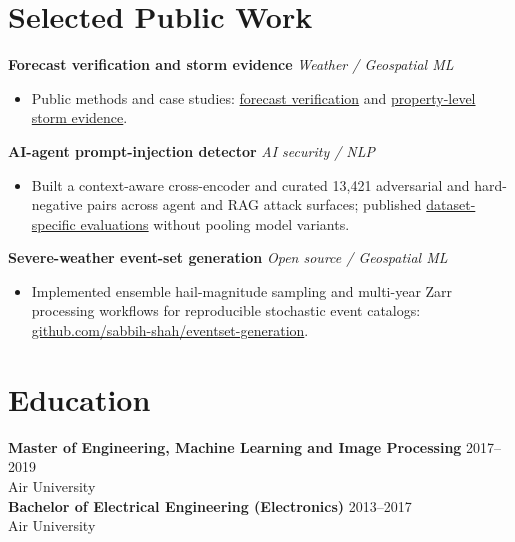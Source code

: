 \documentclass[10pt,letterpaper]{article}
\newcommand{\project}[2]{%
  \textbf{#1} \hfill \textit{#2}\vspace{1pt}
}
\begin{document}
\section*{Selected Public Work}

\project{Forecast verification and storm evidence}{Weather / Geospatial ML}
\begin{itemize}
  \item Public methods and case studies: \href{https://www.editable.ai/forecast/}{forecast verification} and \href{https://www.editable.ai/evidence/}{property-level storm evidence}.
\end{itemize}

\project{AI-agent prompt-injection detector}{AI security / NLP}
\begin{itemize}
  \item Built a context-aware cross-encoder and curated 13,421 adversarial and hard-negative pairs across agent and RAG attack surfaces; published \href{https://sabbih-shah.github.io/projects/agent-security/}{dataset-specific evaluations} without pooling model variants.
\end{itemize}

\project{Severe-weather event-set generation}{Open source / Geospatial ML}
\begin{itemize}
  \item Implemented ensemble hail-magnitude sampling and multi-year Zarr processing workflows for reproducible stochastic event catalogs: \href{https://github.com/sabbih-shah/eventset-generation}{github.com/sabbih-shah/eventset-generation}.
\end{itemize}

\section*{Education}
\textbf{Master of Engineering, Machine Learning and Image Processing} \hfill 2017--2019\\
Air University\\[3pt]
\textbf{Bachelor of Electrical Engineering (Electronics)} \hfill 2013--2017\\
Air University
\end{document}
